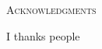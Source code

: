 \begin{center}
  \begin{huge}
    \textsc{Acknowledgments}
  \end{huge}
\end{center}
%
\noindent
%
I thanks people
